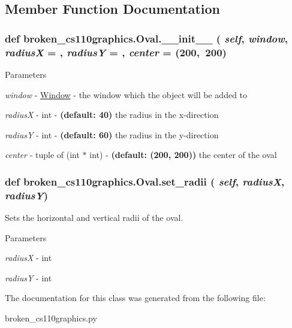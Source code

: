 \subsection{Member Function Documentation}
\hypertarget{classbroken__cs110graphics_1_1Oval_a70f99a9cd217695d81b875b1cbc6e6f3}{
\subsubsection[{\_\-\_\-init\_\-\_\-}]{\setlength{\rightskip}{0pt plus 5cm}def broken\_\-cs110graphics.Oval.\_\-\_\-init\_\-\_\- ( {\em self}, \/   {\em window}, \/   {\em radiusX} = {}, \/   {\em radiusY} = {}, \/   {\em center} = {\ttfamily (200,~200})}}
\label{classbroken__cs110graphics_1_1Oval_a70f99a9cd217695d81b875b1cbc6e6f3}

\begin{DoxyParams}{Parameters}
\item[{\em window}]-\/ \hyperlink{classbroken__cs110graphics_1_1Window}{Window} -\/ the window which the object will be added to \item[{\em radiusX}]-\/ int -\/ {\bfseries (default: 40)} the radius in the x-\/direction \item[{\em radiusY}]-\/ int -\/ {\bfseries (default: 60)} the radius in the y-\/direction \item[{\em center}]-\/ tuple of (int $\ast$ int) -\/ {\bfseries (default: (200, 200))} the center of the oval \end{DoxyParams}
\hypertarget{classbroken__cs110graphics_1_1Oval_aff3c410f0df668c90f99b7220d4e9053}{
\subsubsection[{set\_\-radii}]{\setlength{\rightskip}{0pt plus 5cm}def broken\_\-cs110graphics.Oval.set\_\-radii ( {\em self}, \/   {\em radiusX}, \/   {\em radiusY})}}
\label{classbroken__cs110graphics_1_1Oval_aff3c410f0df668c90f99b7220d4e9053}


Sets the horizontal and vertical radii of the oval. 
\begin{DoxyParams}{Parameters}
\item[{\em radiusX}]-\/ int \item[{\em radiusY}]-\/ int \end{DoxyParams}


The documentation for this class was generated from the following file:\begin{DoxyCompactItemize}
\item 
broken\_\-cs110graphics.py\end{DoxyCompactItemize}
